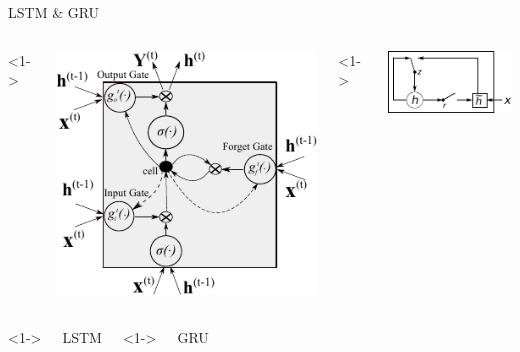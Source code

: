 \begin{xframe}{LSTM \& GRU}


    \begin{columns}
        <1->
        \begin{center}
            \includegraphics[width=\textwidth]{./style/images/LSTM_cell.pdf}
            
        \end{center}

        <1->
        \begin{center}
            \includegraphics[width=\textwidth]{./style/images/gru.pdf}
        \end{center}

    \end{columns}

    \begin{columns}
        <1->
        \begin{center}
            LSTM
        \end{center}

        <1->
        \begin{center}
            GRU
        \end{center}

    \end{columns}

\end{xframe}

